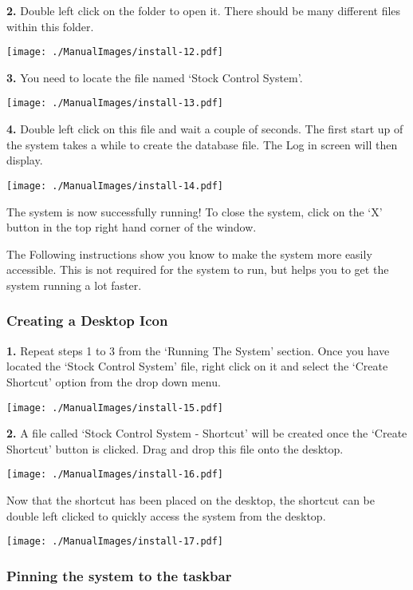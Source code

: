 \textbf{2.} Double left click on the folder to open it. There should be many different files within this folder.

\texttt{[image: ./ManualImages/install-12.pdf]}

\textbf{3.} You need to locate the file named `Stock Control System'.

\texttt{[image: ./ManualImages/install-13.pdf]}

\textbf{4.} Double left click on this file and wait a couple of seconds. The first start up of the system takes a while to create the database file. The Log in screen will then display.

\texttt{[image: ./ManualImages/install-14.pdf]}

The system is now successfully running! To close the system, click on the `X' button in the top right hand corner of the window.

\pagebreak

The Following instructions show you know to make the system more easily accessible. This is not required for the system to run, but helps you to get the system running a lot faster.

\subsubsection{Creating a Desktop Icon}

\textbf{1.} Repeat steps 1 to 3 from the `Running The System' section. Once you have located the `Stock Control System' file, right click on it and select the `Create Shortcut' option from the drop down menu.

\texttt{[image: ./ManualImages/install-15.pdf]}

\textbf{2.} A file called `Stock Control System - Shortcut' will be created once the `Create Shortcut' button is clicked. Drag and drop this file onto the desktop.

\texttt{[image: ./ManualImages/install-16.pdf]}

Now that the shortcut has been placed on the desktop, the shortcut can be double left clicked to quickly access the system from the desktop.

\texttt{[image: ./ManualImages/install-17.pdf]}

\subsubsection{Pinning the system to the taskbar}

